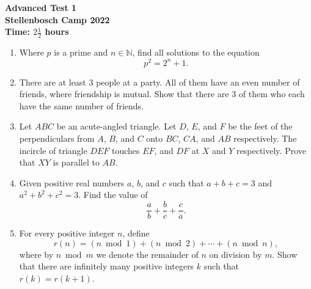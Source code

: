 \documentclass{article}
\begin{document}
\thispagestyle{empty}

\begin{center}
  \textbf{\Large Advanced Test 1}
  \\ \vspace{1em}
  \textbf{\large Stellenbosch Camp 2022}
  \\ \vspace{1em}
  \textbf{\large Time: $2\frac{1}{2}$ hours}
\end{center}

\bigskip
\vfill

\begin{enumerate}[itemsep=\fill]

\item %
Where $p$ is a prime and $n\in\mathbb{N}$, find all solutions to the equation \[p^2 = 2^n + 1.\]

\vspace{0pt}


\item %
There are at least 3 people at a party. All of them have an even number of friends, where friendship is mutual. Show that there are 3 of them who each have the same number of friends.


\item %
Let $ABC$ be an acute-angled triangle. Let $D$, $E$, and $F$ be the feet of the perpendiculars from $A$, $B$, and $C$ onto $BC$, $CA$, and $AB$ respectively. The incircle of triangle $DEF$ touches $EF$, and $DF$ at $X$ and $Y$ respectively. Prove that $XY$ is parallel to $AB$.


\item %
Given positive real numbers $a$, $b$, and $c$ such that $a+b+c = 3$ and $a^2+b^2+c^2 = 3$. Find the value of \[\frac{a}{b} +\frac{b}{c} +\frac{c}{a}.\]

\vspace{0pt}


\item %
For every positive integer $n$, define \[ r(n) = (n \bmod 1) + (n \bmod 2) + \dotsb + (n \bmod n), \]
where by $n \bmod m$ we denote the remainder of $n$ on division by $m$.
Show that there are infinitely many positive integers $k$ such that $r(k) = r(k+1)$.


\end{enumerate}


\vfill
\end{document}
